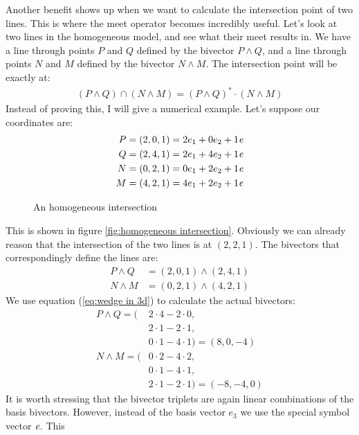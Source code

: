 \documentclass[10pt]{report}
\begin{document}
Another benefit shows up when we want to calculate the
intersection point of two lines. This is where the meet operator
becomes incredibly useful. Let's look at two lines in the
homogeneous model, and see what their meet results in. We have a
line through points $P$ and $Q$ defined by the bivector $P\wedge
Q$, and a line through points $N$ and $M$ defined by the bivector
$N\wedge M$. The intersection point will be exactly at:
\begin{align*}
    (P\wedge Q)\cap (N\wedge M) = (P\wedge Q)^* \cdot (N\wedge M)
\end{align*}
Instead of proving this, I will give a numerical example. Let's
suppose our coordinates are:
\begin{align*}
    P &= (2, 0, 1) = 2e_1 + 0e_2 + 1\emph{e}\\
    Q &= (2, 4, 1) = 2e_1 + 4e_2 + 1\emph{e}\\
    N &= (0, 2, 1) = 0e_1 + 2e_2 + 1\emph{e}\\
    M &= (4, 2, 1) = 4e_1 + 2e_2 + 1\emph{e}
\end{align*}
\begin{figure}[ht]
\centering

\caption{An homogeneous intersection} \label{fig:homogeneous
intersection}
\end{figure}
This is shown in figure \ref{fig:homogeneous intersection}.
Obviously we can already reason that the intersection of the two
lines is at $(2, 2, 1)$. The bivectors that correspondingly define
the lines are:
\begin{align*}
    P\wedge Q &= (2, 0, 1) \wedge (2, 4, 1)  \\
    N\wedge M &= (0, 2, 1) \wedge (4, 2, 1)
\end{align*}
We use equation (\ref{eq:wedge in 3d}) to calculate the
actual bivectors:
\begin{align*}
    P\wedge Q = (&2\cdot 4 - 2\cdot 0, \\
                 &2\cdot 1 - 2\cdot 1, \\
                 &0\cdot 1 - 4\cdot 1) = (8, 0, -4) \\
    N\wedge M = (&0\cdot 2 - 4\cdot 2, \\
                 &0\cdot 1 - 4\cdot 1, \\
                 &2\cdot 1 - 2\cdot 1) = (-8, -4, 0)
\end{align*}
It is worth stressing that the bivector triplets are again linear
combinations of the basis bivectors. However, instead of the basis
vector $e_3$ we use the special symbol vector $\emph{e}$. This
\end{document}
